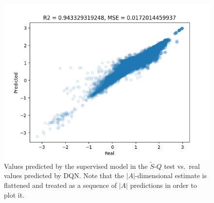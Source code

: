 %
%
\begin{figure}
    \includegraphics[width=\textwidth]{pictures/experiments/FQ_test_pong}
    \centering
    \caption[Predictions of $\tilde{S}$-$Q$ mapping experiment]{Values predicted 
	     by the supervised model in the $\tilde{S}$-$Q$ test vs.\ real 
	     values predicted by DQN. Note that the $|A|$-dimensional estimate 
	     is flattened and treated as a sequence of $|A|$ predictions in 
	     order to plot it.}
    \label{f:FQ_test_space_invaders}
\end{figure}
%

